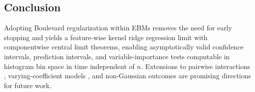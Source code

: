 \begin{table}[H]
    \caption[RMSE, coverage, and training time on high-dimensional real datasets]{We report RMSE, $95\%$ empirical coverage, and training time for Algorithm~\ref{alg:ebm_bratp} (top), and baseline RMSE and training time for vanilla EBM and BRATD (bottom). Baseline coverage is omitted because large-scale uncertainty estimation is not computationally scalable.}
    \label{fig:highdim-real-table}
    \end{table}

    \subsection{Conclusion}
	Adopting Boulevard regularization within EBMs removes the need for early stopping and yields a feature-wise kernel ridge regression limit with componentwise central limit theorems, enabling asymptotically valid confidence intervals, prediction intervals, and variable-importance tests computable in histogram bin space in time independent of $n$. Extensions to pairwise interactions \citep{lengerich2020purifying}, varying-coefficient models \citep{zhou2022decision}, and non-Gaussian outcomes are promising directions for future work.
	
	
	